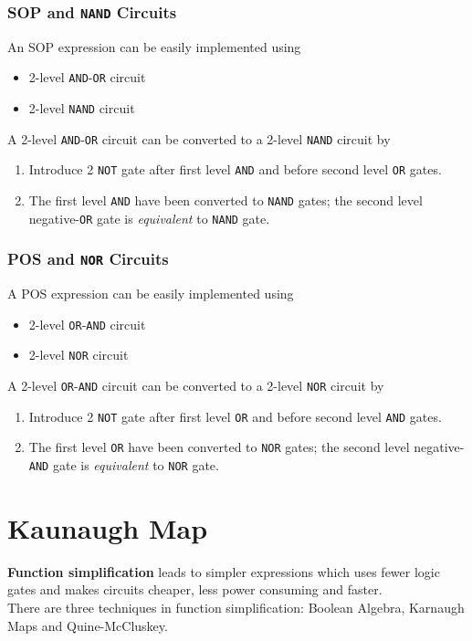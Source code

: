 \documentclass[12pt]{article}
\theoremstyle{definition}
\begin{document}
\subsubsection{SOP and \texttt{NAND} Circuits}
An SOP expression can be easily implemented using
\begin{itemize}
  \item 2-level \texttt{AND}-\texttt{OR} circuit
  \item 2-level \texttt{NAND} circuit
\end{itemize}
A 2-level \texttt{AND}-\texttt{OR} circuit can be converted to a 2-level \texttt{NAND} circuit by
\begin{enumerate}
  \item Introduce 2 \texttt{NOT} gate after first level \texttt{AND} and before second level \texttt{OR} gates.
  \item The first level \texttt{AND} have been converted to \texttt{NAND} gates; the second level negative-\texttt{OR} gate is \textit{equivalent} to \texttt{NAND} gate.
\end{enumerate} 
\subsubsection{POS and \texttt{NOR} Circuits}
A POS expression can be easily implemented using
\begin{itemize}
  \item 2-level \texttt{OR}-\texttt{AND} circuit
  \item 2-level \texttt{NOR} circuit
\end{itemize}
A 2-level \texttt{OR}-\texttt{AND} circuit can be converted to a 2-level \texttt{NOR} circuit by
\begin{enumerate}
  \item Introduce 2 \texttt{NOT} gate after first level \texttt{OR} and before second level \texttt{AND} gates.
  \item The first level \texttt{OR} have been converted to \texttt{NOR} gates; the second level negative-\texttt{AND} gate is \textit{equivalent} to \texttt{NOR} gate.
\end{enumerate} 
\clearpage
\section{Kaunaugh Map}
\textbf{Function simplification} leads to simpler expressions which uses fewer logic gates and makes circuits cheaper, less power consuming and faster.\\
There are three techniques in function simplification: Boolean Algebra, Karnaugh Maps and Quine-McCluskey.
\end{document}
